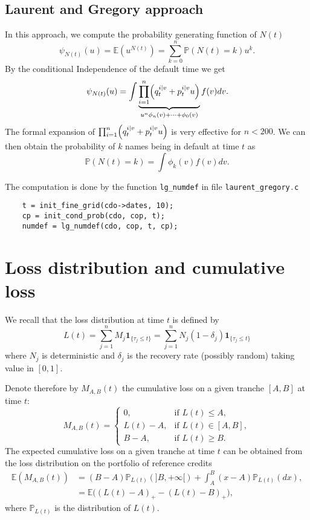 \documentclass[10pt, a4paper]{article}
\newcommand{\code}[1]{{\upshape \lstinline[language=c]{#1}}}
\newcommand{\E}{\mathbb{E}}
\renewcommand{\P}{\mathbb{P}}
\begin{document}
\subsection{Laurent and Gregory approach} \label{lg}
In this approach, we compute the probability generating function of $N(t)$ 
\begin{equation*}
    \psi_{N(t)}(u) = \E(u^{N(t)}) = \sum_{k=0}^n \P(N(t)=k) u^k. 
\end{equation*}
By the conditional Independence of the default time we get 
\begin{equation*}
    \psi_{N(t)}(u) = \int \underbrace{\prod_{i=1}^n \Bigl( q_t^{i|v} + p_t^{i|v} u \Bigr)}_{u^n \phi_n(v) + \cdots + \phi_0(v)} f(v) d v.
\end{equation*}
The formal expansion of $\prod_{i=1}^n \Bigl( q_t^{i|v} + p_t^{i|v} u \Bigr)$ is very effective for $n < 200$. We can then obtain the probability of $k$ names being in default at time $t$ as 
\begin{equation*}
    \P(N(t) = k) = \int \phi_k(v) f(v) d v.
\end{equation*}

The computation is done by the function \code{lg_numdef} in file \code{laurent_gregory.c}
\begin{lstlisting}
    t = init_fine_grid(cdo->dates, 10);
    cp = init_cond_prob(cdo, cop, t);
    numdef = lg_numdef(cdo, cop, t, cp);
\end{lstlisting}

\section{Loss distribution and cumulative loss}
We recall that the loss distribution at time $t$ is defined by 
\begin{equation*}
    L(t) = \sum_{j=1}^n M_j \mathbf{1}_{\{\tau_j \le t\}} = 
    \sum_{j=1}^n N_j (1-\delta_j) \mathbf{1}_{\{\tau_j \le t\}}
\end{equation*}
where $N_j$ is deterministic and $\delta_j$ is the recovery rate (possibly random) taking value in $[0,1]$.

Denote therefore by $M_{A,B}(t)$ the cumulative loss on a given tranche $[A, B]$ at time $t$: 
\begin{equation*}
    M_{A,B}(t) = \begin{cases}
        0, & \text{if $L(t) \le A$}, \\
        L(t) - A, & \text{if $L(t) \in [A, B]$}, \\
        B - A, & \text{if $L(t) \ge B$}.
    \end{cases}
\end{equation*}
The expected cumulative loss on a given tranche at time $t$ can be obtained from the loss distribution on the portfolio of reference credits
\begin{align*}
    \E(M_{A,B}(t)) &= (B-A) \P_{L(t)}(]B, +\infty[) + \int_A^B (x-A) \P_{L(t)}(dx), \\
    &= \E \bigl((L(t) - A)_+ - (L(t) - B)_+\bigr),
\end{align*}
where $\P_{L(t)}$ is the distribution of $L(t)$. 
\end{document}
